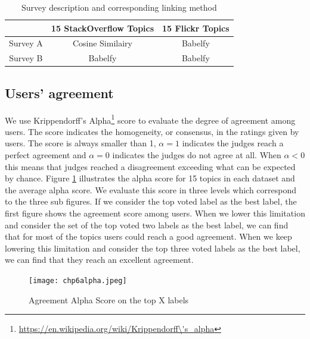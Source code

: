 \begin{table}[htp]
\caption{Survey description and corresponding linking method}
\label{tab:chp6survey}
\centering
\begin{tabular}{|c|c|c|}
\hline
             &  15 StackOverflow Topics & 15 Flickr Topics \\ \hline
    Survey A & Cosine Similairy & Babelfy\\ \hline  
    Survey B &  Babelfy          & Babelfy\\ \hline
\end{tabular}

\end{table}


\subsection{Users' agreement}
We use Krippendorff's Alpha\footnote{\url{https://en.wikipedia.org/wiki/Krippendorff\'s_alpha}} score to evaluate the degree of agreement among users. The score indicates the homogeneity, or consensus, in the ratings given by users. The score is always smaller than 1, $\alpha = 1 $ indicates the judges reach a perfect agreement and $\alpha =0 $ indicates the judges do not agree at all. When $\alpha <0 $ this means that judges reached a disagreement exceeding what can be expected by chance.  
Figure \ref{fig:chp6alpha} illustrates the alpha score for 15 topics in each dataset and the average alpha score. We evaluate this score in three levels which correspond to the three sub figures. If we consider the top voted label as the best label, the first figure shows the agreement score among users. When we lower this limitation and consider the set of the top voted two labels as the best label, we can find that for most of the topics users could reach a good agreement. When we keep lowering this limitation and consider the top three voted labels as the best label, we can find that they reach an excellent agreement. 


\begin{figure}[htp]
\caption{Agreement Alpha Score on the top X labels}
\label{fig:chp6alpha} 
\centering
\texttt{[image: chp6alpha.jpeg]}  
\end{figure}


